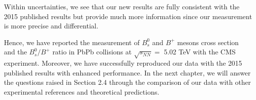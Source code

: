 Within uncertainties, we see that our new results are fully consistent with the 2015 published results but provide much more information since our measurement is more precise and differential.  

Hence, we have reported the measurement of $B^0_s$ and $B^+$ mesons cross section and the $B^0_s/B^+$ ratio in PbPb collisions at $\sqrt{s_{NN}} =$ 5.02 TeV with the CMS experiment. Moreover, we have successfully reproduced our data with the 2015 published results with enhanced performance. In the next chapter, we will answer the questions raised in Section 2.4 through the comparison of our data with other experimental references and theoretical predictions. 



